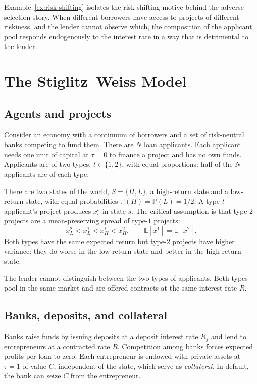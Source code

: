 \documentclass[11pt,a4paper,oneside]{book}
\def\E{\mathbb{E}}
\renewcommand{\P}{\mathbb{P}}
\theoremstyle{plain}
\theoremstyle{definition}
\theoremstyle{remark}
\numberwithin{equation}{chapter}
\begin{document}
Example~\ref{ex:risk-shifting} isolates the risk-shifting motive behind the adverse-selection story.
When different borrowers have access to projects of different riskiness, and the lender cannot observe which, the composition of the applicant pool responds endogenously to the interest rate in a way that is detrimental to the lender.

\section{The Stiglitz--Weiss Model}
\label{sec:SW-model}

\subsection{Agents and projects}

Consider an economy with a continuum of borrowers and a set of risk-neutral banks competing to fund them.
There are $N$ loan applicants.
Each applicant needs one unit of capital at $\tau = 0$ to finance a project and has no own funds.
Applicants are of two types, $t \in \{1, 2\}$, with equal proportions: half of the $N$ applicants are of each type.

There are two states of the world, $S = \{H, L\}$, a high-return state and a low-return state, with equal probabilities $\P(H) = \P(L) = 1/2$.
A type-$t$ applicant's project produces $x^t_s$ in state $s$.
The critical assumption is that type-$2$ projects are a mean-preserving spread of type-$1$ projects:
\begin{equation}\label{eq:MPS}
  x^2_L < x^1_L < x^1_H < x^2_H,
  \qquad
  \E[x^1] = \E[x^2].
\end{equation}
Both types have the same expected return but type-$2$ projects have higher variance: they do worse in the low-return state and better in the high-return state.

The lender cannot distinguish between the two types of applicants.
Both types pool in the same market and are offered contracts at the same interest rate $R$.

\subsection{Banks, deposits, and collateral}

Banks raise funds by issuing deposits at a deposit interest rate $R_f$ and lend to entrepreneurs at a contracted rate $R$.
Competition among banks forces expected profits per loan to zero.
Each entrepreneur is endowed with private assets at $\tau = 1$ of value $C$, independent of the state, which serve as \emph{collateral}.
In default, the bank can seize $C$ from the entrepreneur.
\end{document}
